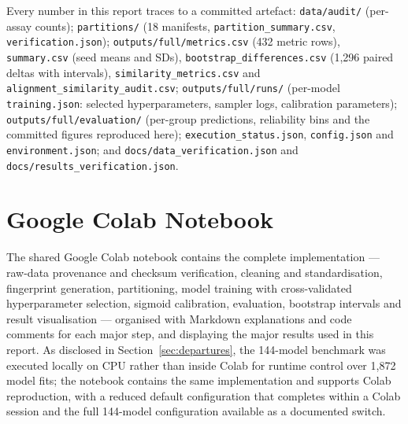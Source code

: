 \documentclass[10pt,letterpaper]{article}
\begin{document}
Every number in this report traces to a committed artefact: \texttt{data/audit/} (per-assay counts);
\texttt{partitions/} (18 manifests, \texttt{partition\_summary.csv}, \texttt{verification.json});
\texttt{outputs/full/metrics.csv} (432 metric rows), \texttt{summary.csv} (seed means and SDs),
\texttt{bootstrap\_differences.csv} (1{,}296 paired deltas with intervals),
\texttt{similarity\_metrics.csv} and \texttt{alignment\_similarity\_audit.csv};
\texttt{outputs/full/runs/} (per-model \texttt{training.json}: selected hyperparameters, sampler logs,
calibration parameters); \texttt{outputs/full/evaluation/} (per-group predictions, reliability bins
and the committed figures reproduced here); \texttt{execution\_status.json}, \texttt{config.json} and
\texttt{environment.json}; and \texttt{docs/data\_verification.json} and
\texttt{docs/results\_verification.json}.

\section*{Google Colab Notebook}
\label{sec:colab}

The shared Google Colab notebook contains the complete implementation --- raw-data provenance and
checksum verification, cleaning and standardisation, fingerprint generation, partitioning, model training with
cross-validated hyperparameter selection, sigmoid calibration, evaluation, bootstrap intervals and
result visualisation --- organised with Markdown explanations and code comments for each major step,
and displaying the major results used in this report. As disclosed in
Section~\ref{sec:departures}, the 144-model benchmark was executed locally on CPU rather than inside
Colab for runtime control over 1{,}872 model fits; the notebook contains the same implementation and
supports Colab reproduction, with a reduced default configuration that completes within a Colab
session and the full 144-model configuration available as a documented switch.

\vspace{0.2em}
\begin{center}
\end{center}
\end{document}
